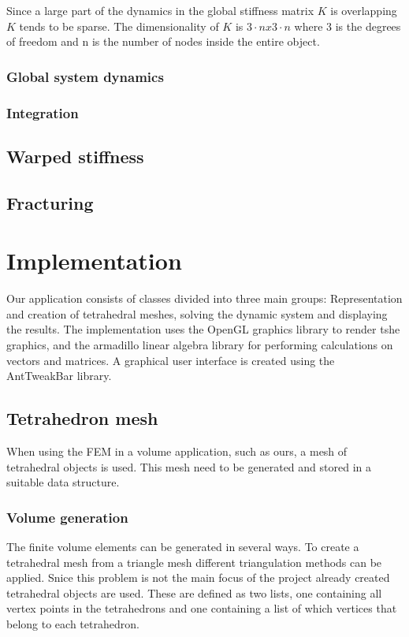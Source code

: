 \documentclass[10pt,a4paper]{article}
\begin{document}
 Since a large part of the dynamics in the global stiffness matrix $K$ is overlapping $K$ tends to be sparse. The dimensionality of $K$ is $3 \cdot n x 3 \cdot n$ where 3 is the degrees of freedom and n is the number of nodes inside the entire object.

\subsubsection{Global system dynamics}


\subsubsection{Integration}


\subsection{Warped stiffness}



\subsection{Fracturing}



\section{Implementation}
Our application consists of classes divided into three main groups: Representation and creation of tetrahedral meshes, solving the dynamic system and displaying the results. The implementation uses the OpenGL graphics library to render tshe graphics, and the armadillo linear algebra library for performing calculations on vectors and matrices. A graphical user interface is created using the AntTweakBar library.

\subsection{Tetrahedron mesh}
When using the FEM in a volume application, such as ours, a mesh of tetrahedral objects is used. This mesh need to be generated and stored in a suitable data structure.

\subsubsection{Volume generation}
The finite volume elements can be generated in several ways. To create a tetrahedral mesh from a triangle mesh different triangulation methods can be applied. Snice this problem is not the main focus of the project already created tetrahedral objects are used. These are defined as two lists, one containing all vertex points in the tetrahedrons and one containing a list of which vertices that belong to each tetrahedron.
\end{document}
